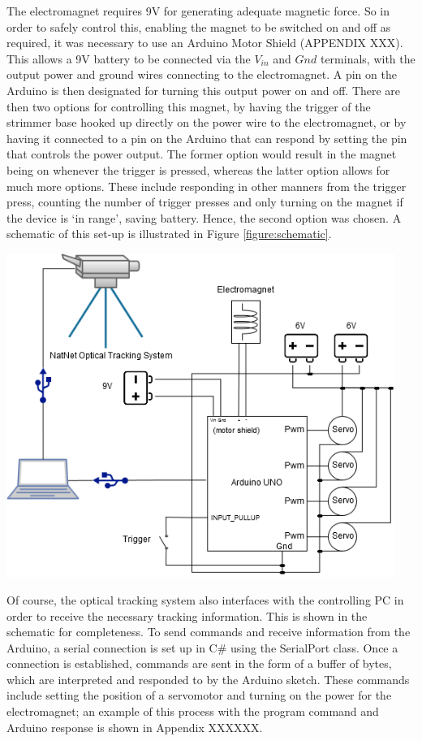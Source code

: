 \documentclass[11pt]{article}
\begin{document}
The electromagnet requires 9V for generating adequate magnetic force. So in order to safely control this, enabling the magnet to be switched on and off as required, it was necessary to use an Arduino Motor Shield (APPENDIX XXX). This allows a 9V battery to be connected via the $V_{in}$ and $Gnd$ terminals, with the output power and ground wires connecting to the electromagnet. A pin on the Arduino is then designated for turning this output power on and off. There are then two options for controlling this magnet, by having the trigger of the strimmer base hooked up directly on the power wire to the electromagnet, or by having it connected to a pin on the Arduino that can respond by setting the pin that controls the power output. The former option would result in the magnet being on whenever the trigger is pressed, whereas the latter option allows for much more options. These include responding in other manners from the trigger press, counting the number of trigger presses and only turning on the magnet if the device is `in range', saving battery. Hence, the second option was chosen. A schematic of this set-up is illustrated in Figure \ref{figure:schematic}.


\begin{center}
\includegraphics[width=0.95\textwidth]{images/newSchematic.png}
\label{figure:schematic}
\end{center}

Of course, the optical tracking system also interfaces with the controlling PC in order to receive the necessary tracking information. This is shown in the schematic for completeness. To send commands and receive information from the Arduino, a serial connection is set up in C\# using the SerialPort class. Once a connection is established, commands are sent in the form of a buffer of bytes, which are interpreted and responded to by the Arduino sketch. These commands include setting the position of a servomotor and turning on the power for the electromagnet; an example of this process with the program command and Arduino response is shown in Appendix XXXXXX.
\end{document}
